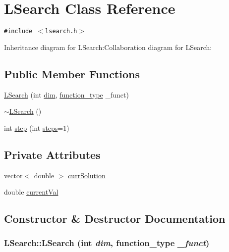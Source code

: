 \hypertarget{classLSearch}{
\section{LSearch Class Reference}
\label{classLSearch}
}
{\tt \#include $<$lsearch.h$>$}

Inheritance diagram for LSearch:Collaboration diagram for LSearch:\subsection*{Public Member Functions}
\begin{CompactItemize}
\item 
\hyperlink{classLSearch_eb6f8ee3b08db0f323598a192a1d0f72}{LSearch} (int \hyperlink{classPSO_4f1ce768b59640f64ed2b270764b32b1}{dim}, \hyperlink{optfunctions_8h_6e6333c061b2073ba9abaaf67e20164b}{function\_\-type} \_\-funct)
\item 
\hyperlink{classLSearch_d61ebeeb7e15d2e5553317687a604101}{$\sim$LSearch} ()
\item 
int \hyperlink{classLSearch_bac6ce81e34ee717b854ec1772962883}{step} (int \hyperlink{runpso_8cpp_b4ae7205573977222eadd0795db193e2}{steps}=1)
\end{CompactItemize}
\subsection*{Private Attributes}
\begin{CompactItemize}
\item 
vector$<$ double $>$ \hyperlink{classLSearch_1bae97be8b9bb5d3cd4cc962a87d878c}{currSolution}
\item 
double \hyperlink{classLSearch_02c68c126e7e8714fede96362658de8d}{currentVal}
\end{CompactItemize}


\subsection{Constructor \& Destructor Documentation}
\hypertarget{classLSearch_eb6f8ee3b08db0f323598a192a1d0f72}{
\subsubsection{\setlength{\rightskip}{0pt plus 5cm}LSearch::LSearch (int {\em dim}, \/  {\bf function\_\-type} {\em \_\-funct})}}
\label{classLSearch_eb6f8ee3b08db0f323598a192a1d0f72}


